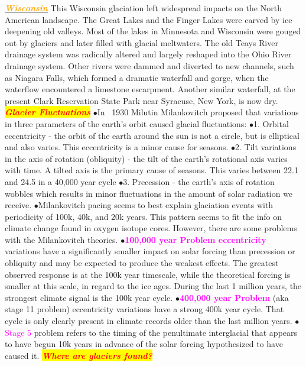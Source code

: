 \documentclass{article}
\newcommand{\ddd}{$\bullet$}
\newcommand{\red}[1]{\textcolor{red}{#1}}
\newcommand{\pink}[1]{\textcolor{magenta}{#1}}
\newcommand{\orange}[1]{\textcolor{orange}{#1}}
\newcommand{\mysection}[1]{\colorbox{yellow}{\textbf{\textit{\red{#1}}}}}
\newcommand{\mysub}[1]{\underline{\textbf{{\textit{\orange{#1}}}}}}
\newcommand{\vocab}[1]{{\pink{#1}}}
\begin{document}
\begin{multicols*}{4}
             \mysub{Wisconsin}
             	This Wisconsin glaciation left widespread impacts on the North American landscape. The Great Lakes and the Finger Lakes were carved by ice deepening old valleys. Most of the lakes in Minnesota and Wisconsin were gouged out by glaciers and later filled with glacial meltwaters. The old Teays River drainage system was radically altered and largely reshaped into the Ohio River drainage system. Other rivers were dammed and diverted to new channels, such as Niagara Falls, which formed a dramatic waterfall and gorge, when the waterflow encountered a limestone escarpment. Another similar waterfall, at the present Clark Reservation State Park near Syracuse, New York, is now dry.
     \mysection{Glacier Fluctuations}
	        \ddd In ~1930 Milutin Milankovitch proposed that variations in three parameters of the earth's orbit caused glacial fluctuations: 
	        \ddd 1.	Orbital eccentricity - the orbit of the earth around the sun is not a circle, but is elliptical and also varies. This eccentricity is a minor cause for seasons.
	        \ddd 2.	Tilt variations in the axis of rotation (obliquity) - the tilt of the earth's rotational axis varies with time. A tilted axis is the primary cause of seasons. This varies between 22.1 and 24.5 in a 40,000 year cycle
	        \ddd 3.	Precession - the earth's axis of rotation wobbles which results in minor fluctuations in the amount of solar radiation we receive.
	        \ddd Milankovitch pacing seems to best explain glaciation events with periodicity of 100k, 40k, and 20k years. This pattern seems to fit the info on climate change found in oxygen isotope cores. However, there are some problems with the Milankovitch theories.
	        \ddd \vocab{\textbf{100,000 year Problem eccentricity}} variations have a significantly smaller impact on solar forcing than precession or obliquity and may be expected to produce the weakest effects. The greatest observed response is at the 100k year timescale, while the theoretical forcing is smaller at this scale, in regard to the ice ages. During the last 1 million years, the strongest climate signal is the 100k year cycle.
	        \ddd \vocab{\textbf{400,000 year Problem}} (aka stage 11 problem) eccentricity variations have a strong 400k year cycle. That cycle is only clearly present in climate records older than the last million years.
	        \ddd \vocab{Stage 5} problem refers to the timing of the penultimate interglacial that appears to have begun 10k years in advance of the solar forcing hypothesized to have caused it.
        \mysection{Where are glaciers found?}

\end{multicols*}
\end{document}
